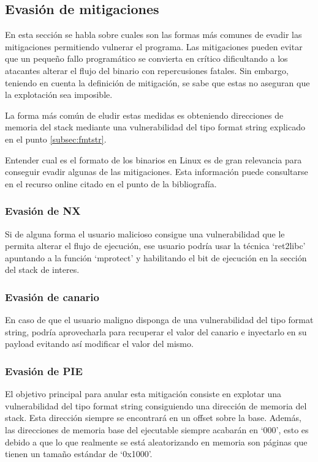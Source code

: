 \subsection{Evasión de mitigaciones}
En esta sección se habla sobre cuales son las formas más comunes de evadir las mitigaciones permitiendo vulnerar el programa.
Las mitigaciones pueden evitar que un pequeño fallo programático se convierta en crítico dificultando a los atacantes alterar el flujo del binario con repercusiones fatales.
Sin embargo, teniendo en cuenta la definición de mitigación, se sabe que estas no aseguran que la explotación sea imposible.

La forma más común de eludir estas medidas es obteniendo direcciones de memoria del stack mediante una vulnerabilidad del tipo format string explicado en el punto \ref{subsec:fmtstr}.

Entender cual es el formato de los binarios en Linux es de gran relevancia para conseguir evadir algunas de las mitigaciones.
Esta información puede consultarse en el recurso online citado en el punto \cite{x64asm} de la bibliografía.

\subsubsection{Evasión de NX}
Si de alguna forma el usuario malicioso consigue una vulnerabilidad que le permita alterar el flujo de ejecución, ese usuario podría usar la técnica `ret2libc' apuntando a la función `mprotect' y habilitando el bit de ejecución en la sección del stack de interes.

\subsubsection{Evasión de canario}
En caso de que el usuario maligno disponga de una vulnerabilidad del tipo format string, podría aprovecharla para recuperar el valor del canario e inyectarlo en su payload evitando así modificar el valor del mismo.
\subsubsection{Evasión de PIE} \label{subsub:pie}
El objetivo principal para anular esta mitigación consiste en explotar una vulnerabilidad del tipo format string consiguiendo una dirección de memoria del stack.
Esta dirección siempre se encontrará en un offset sobre la base.
Además, las direcciones de memoria base del ejecutable siempre acabarán en `000', esto es debido a que lo que realmente se está aleatorizando en memoria son páginas que tienen un tamaño estándar de `0x1000'.

